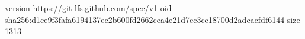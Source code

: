 version https://git-lfs.github.com/spec/v1
oid sha256:d1ce9f3fafa6194137ec2b600fd2662cea4e21d7cc3ce18700d2adcacfdf6144
size 1313
